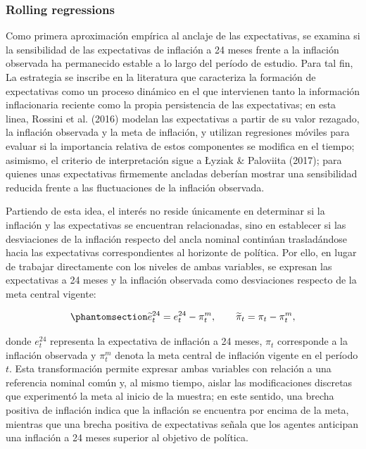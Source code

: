 \documentclass[
  10.5pt,
  letterpaper,
  twocolumn]{article}
\begin{document}
\subsubsection{Rolling regressions}\label{rolling-regressions}

Como primera aproximación empírica al anclaje de las expectativas, se
examina si la sensibilidad de las expectativas de inflación a 24 meses
frente a la inflación observada ha permanecido estable a lo largo del
período de estudio. Para tal fin, La estrategia se inscribe en la
literatura que caracteriza la formación de expectativas como un proceso
dinámico en el que intervienen tanto la información inflacionaria
reciente como la propia persistencia de las expectativas; en esta linea,
Rossini et al. (2016) modelan las expectativas a partir de su valor
rezagado, la inflación observada y la meta de inflación, y utilizan
regresiones móviles para evaluar si la importancia relativa de estos
componentes se modifica en el tiempo; asimismo, el criterio de
interpretación sigue a Łyziak \& Paloviita (2017); para quienes unas
expectativas firmemente ancladas deberían mostrar una sensibilidad
reducida frente a las fluctuaciones de la inflación observada.

Partiendo de esta idea, el interés no reside únicamente en determinar si
la inflación y las expectativas se encuentran relacionadas, sino en
establecer si las desviaciones de la inflación respecto del ancla
nominal continúan trasladándose hacia las expectativas correspondientes
al horizonte de política. Por ello, en lugar de trabajar directamente
con los niveles de ambas variables, se expresan las expectativas a 24
meses y la inflación observada como desviaciones respecto de la meta
central vigente:

\begin{equation}\phantomsection\label{eq-brechas-rolling}{
\widetilde{e}^{24}_t
=
e^{24}_t-\pi^m_t,
\qquad
\widetilde{\pi}_t
=
\pi_t-\pi^m_t,
}\end{equation}

donde \(e^{24}_t\) representa la expectativa de inflación a 24 meses,
\(\pi_t\) corresponde a la inflación observada y \(\pi^m_t\) denota la
meta central de inflación vigente en el período \(t\). Esta
transformación permite expresar ambas variables con relación a una
referencia nominal común y, al mismo tiempo, aislar las modificaciones
discretas que experimentó la meta al inicio de la muestra; en este
sentido, una brecha positiva de inflación indica que la inflación se
encuentra por encima de la meta, mientras que una brecha positiva de
expectativas señala que los agentes anticipan una inflación a 24 meses
superior al objetivo de política.
\end{document}
